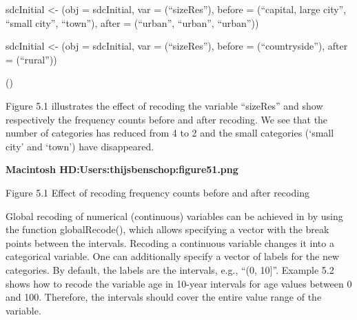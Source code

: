 \documentclass[letterpaper,10pt,english]{sphinxmanual}
\begin{document}
\begin{DUlineblock}{0em}
\item[] 
\item[] sdcInitial \textless{}- (obj = sdcInitial, var =
(“sizeRes”), before = (“capital, large city”, “small
city”, “town”), after = (“urban”, “urban”, “urban”))
\item[] 
\item[] sdcInitial \textless{}- (obj = sdcInitial, var =
(“sizeRes”), before = (“countryside”), after =
(“rural”))
\item[] 
\item[] ()
\end{DUlineblock}

\begin{DUlineblock}{0em}
\item[] 
\item[] 
\end{DUlineblock}

Figure 5.1 illustrates the effect of recoding the variable “sizeRes” and
show respectively the frequency counts before and after recoding. We see
that the number of categories has reduced from 4 to 2 and the small
categories (‘small city’ and ‘town’) have disappeared.

{\color{red}\bfseries{}\textbar{}Macintosh HD:Users:thijsbenschop:figure51.png\textbar{}}

Figure 5.1 Effect of recoding \textendash{} frequency counts before and after
recoding


Global recoding of numerical (continuous) variables can be achieved in
 by using the function globalRecode(), which allows specifying
a vector with the break points between the intervals. Recoding a
continuous variable changes it into a categorical variable. One can
additionally specify a vector of labels for the new categories. By
default, the labels are the intervals, e.g., “(0, 10{]}”. Example 5.2
shows how to recode the variable age in 10-year intervals for age values
between 0 and 100.  Therefore, the intervals
should cover the entire value range of the variable.
\end{document}
